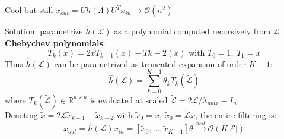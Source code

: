 \documentclass[8pt]{beamer}
\begin{document}
\begin{frame}

Cool but still $x_{out} = U\hat{h}(\Lambda)U^{T}x_{in} \rightarrow \mathcal{O}(n^2)$

Solution: parametrize $\hat{h}(\mathcal{L})$ as a polynomial computed recursively from $\mathcal{L}$ \\

\textbf{Chebychev polynomials}:
\begin{equation*}
	T_k(x) = 2xT_{k-1}(x)-T{k-2}(x) \text{ with } T_0 = 1, ~ T_1 = x
\end{equation*}
Thus $\hat{h}(\mathcal{L})$ can be parametrized as truncated expansion of order $K-1$:
\begin{equation*}
	\hat{h}(\mathcal{L}) = \sum_{k=0}^{K-1} \theta_k T_{k}(\mathcal{\tilde{L}})
\end{equation*}
where $T_{k}(\mathcal{\tilde{L}}) \in \mathbb{R}^{n\times n}$ is evaluated at scaled $\mathcal{\tilde{L}} = 2\mathcal{L}/\lambda_{max} - I_{n}$. \\
Denoting $\tilde{x} = 2\tilde{\mathcal{L}}\tilde{x}_{k-1} - \tilde{x}_{k-2} \text{ with } \tilde{x}_{0} = x, ~ \tilde{x}_{0} = \mathcal{\tilde{L}}x$, the entire filtering is:
\begin{equation*}
	x_{out} = \hat{h}(\mathcal{L})x_{in} = [\tilde{x}_{0}, \ldots, \tilde{x}_{K-1}]\theta \xrightarrow{cost} \mathcal{O}(K|\mathcal{E}|)
\end{equation*}
\end{frame}
\end{document}
